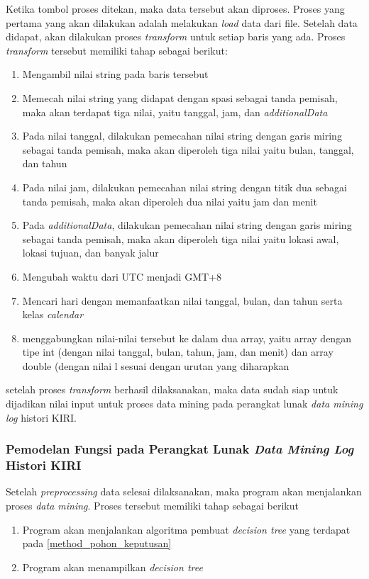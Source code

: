 Ketika tombol proses ditekan, maka data tersebut akan diproses. Proses yang pertama yang akan dilakukan adalah melakukan \textsl{load} data dari file. Setelah data didapat, akan dilakukan proses \textsl{transform} untuk setiap baris yang ada. Proses \textsl{transform} tersebut memiliki tahap sebagai berikut:
\begin{enumerate}
	\item Mengambil nilai string pada baris tersebut
	\item Memecah nilai string yang didapat dengan spasi sebagai tanda pemisah, maka akan terdapat tiga nilai, yaitu tanggal, jam, dan \textsl{additionalData}
	\item Pada nilai tanggal, dilakukan pemecahan nilai string dengan garis miring sebagai tanda pemisah, maka akan diperoleh tiga nilai yaitu bulan, tanggal, dan tahun
	\item Pada nilai jam, dilakukan pemecahan nilai string dengan titik dua sebagai tanda pemisah, maka akan diperoleh dua nilai yaitu jam dan menit
	\item Pada \textsl{additionalData}, dilakukan pemecahan nilai string dengan garis miring sebagai tanda pemisah, maka akan diperoleh tiga nilai yaitu lokasi awal, lokasi tujuan, dan banyak jalur
	\item Mengubah waktu dari UTC menjadi GMT+8
	\item Mencari hari dengan memanfaatkan nilai tanggal, bulan, dan tahun serta kelas \textsl{calendar}
	\item menggabungkan nilai-nilai tersebut ke dalam dua array, yaitu array dengan tipe int (dengan nilai tanggal, bulan, tahun, jam, dan menit) dan array double (dengan nilai l sesuai dengan urutan yang diharapkan
\end{enumerate}

setelah proses \textsl{transform} berhasil dilaksanakan, maka data sudah siap untuk dijadikan nilai input untuk proses data mining pada perangkat lunak \textsl{data mining log} histori KIRI.

\subsubsection{Pemodelan Fungsi pada Perangkat Lunak \textsl{Data Mining Log} Histori KIRI}
Setelah \textsl{preprocessing} data selesai dilaksanakan, maka program akan menjalankan proses \textsl{data mining}. Proses tersebut memiliki tahap sebagai berikut
\begin{enumerate}
	\item Program akan menjalankan algoritma pembuat \textsl{decision tree} yang terdapat pada \ref{method_pohon_keputusan}
	\item Program akan menampilkan \textsl{decision tree}
\end{enumerate}  

